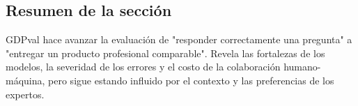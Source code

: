 \subsection{Resumen de la sección}

GDPval hace avanzar la evaluación de "responder correctamente una pregunta" a "entregar un producto profesional comparable". Revela las fortalezas de los modelos, la severidad de los errores y el costo de la colaboración humano-máquina, pero sigue estando influido por el contexto y las preferencias de los expertos.

